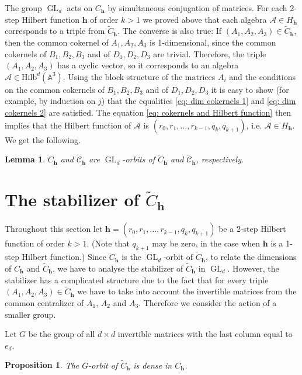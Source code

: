 \documentclass[11pt]{amsart}
\newtheorem{prop}[thm]{Proposition}
\newtheorem{lemma}[thm]{Lemma}
\theoremstyle{definition}
\DeclareMathOperator{\GL}{GL}
\newcommand{\A}{\mathbb{A}}
\newcommand{\Hilb}[2]{\mathrm{Hilb}^{#1}(\A^{#2})}
\newcommand{\h}{\mathbf{h}}
\newcommand{\cC}{\mathscr{C}}
\newcommand{\tC}{\widetilde{C}}
\newcommand{\tcC}{\widetilde{\mathscr{C}}}
\newcommand{\cA}{\mathcal{A}}
\begin{document}
The group $\GL_d$ acts on $C_\h$ by simultaneous conjugation of matrices. For each 2-step Hilbert function $\h$ of order $k>1$ we proved above that each algebra $\cA\in H_\h$ corresponds to a triple from $\tC_\h$. The converse is also true: If $(A_1,A_2,A_3)\in \tC_\h$, then the common cokernel of $A_1, A_2 ,A_3$ is 1-dimensional, since the common cokernels of $B_1,B_2,B_3$ and of $D_1,D_2,D_3$ are trivial. Therefore, the triple $(A_1,A_2,A_3)$ has a cyclic vector, so it corresponds to an algebra $\cA\in \Hilb{d}{3}$. Using the block structure of the matrices $A_i$ and the conditions on the common cokernels of $B_1,B_2,B_3$ and of $D_1,D_2,D_3$ it is easy to show (for example, by induction on $j$) that the equalities \eqref{eq: dim cokernels 1} and \eqref{eq: dim cokernels 2} are satisfied. The equation \eqref{eq: cokernels and Hilbert function} then implies that the Hilbert function of $\cA$ is $(r_0,r_1,\ldots ,r_{k-1},q_k,q_{k+1})$, i.e. $\cA\in H_\h$. We get the following.

\begin{lemma}
$C_\h$ and $\cC_\h$ are $\GL_d$-orbits of $\tC_\h$ and $\tcC_\h$, respectively. 
\end{lemma}



\section{The stabilizer of $\tC_\h$}

Throughout this section let $\h=(r_0,r_1,\ldots ,r_{k-1},q_k,q_{k+1})$ be a 2-step Hilbert function of order $k>1$. (Note that $q_{k+1}$ may be zero, in the case when $\h$ is a 1-step Hilbert function.) Since $C_\h$ is the $\GL_d$-orbit of $\tC_\h$, to relate the dimensions of $C_\h$ and $\tC_\h$, we have to analyse the stabilizer of $\tC_\h$ in $\GL_d$. However, the stabilizer has a complicated structure due to the fact that for every triple $(A_1,A_2,A_3)\in \tC_\h$ we have to take into account the invertible matrices from the common centralizer of $A_1$, $A_2$ and $A_3$. Therefore we consider the action of a smaller group.

Let $G$ be the group of all $d\times d$ invertible matrices with the last column equal to $e_d$.

\begin{prop}\label{prop: G-orbit dense}
The $G$-orbit of $\tC_\h$ is dense in $C_\h$.
\end{prop}
\end{document}
